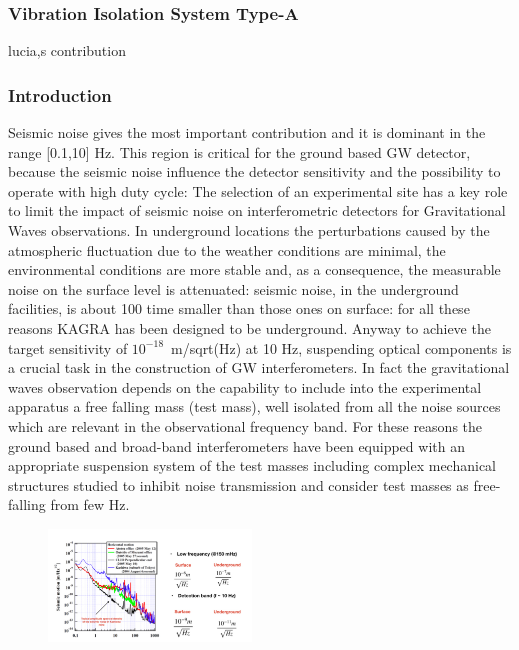 \vspace{10pt}
\subsubsection*{\bf Vibration Isolation System Type-A}
\vspace{3pt}

\vspace{3pt}
lucia,s contribution
%
\subsubsection*{\bi Introduction}
Seismic noise gives the most important contribution and it is dominant in the range [0.1,10] Hz. This region is critical for the ground based GW detector, because the seismic noise influence the detector sensitivity and the possibility to operate with high duty cycle: The selection of an experimental site has a key role to limit the impact of seismic noise on interferometric detectors for Gravitational Waves observations. In underground locations the perturbations caused by the atmospheric fluctuation due to the weather conditions are minimal, the environmental conditions are more stable and, as a consequence, the measurable noise on the surface level is attenuated: seismic noise, in the underground facilities, is about 100 time smaller than those ones on surface:  for all these reasons  KAGRA has been designed to be underground.
Anyway to achieve the target sensitivity of  $10^{-18}$\, m/sqrt(Hz) at 10 Hz, suspending optical components is a crucial task in the construction of GW interferometers. In fact the gravitational waves observation depends on the capability to include into the experimental apparatus a free falling mass (test mass), well isolated from all the noise sources which are relevant in the observational frequency band.
For these reasons the ground based and broad-band interferometers have been equipped with an appropriate suspension system of the test masses including complex mechanical structures studied to inhibit noise transmission and consider test masses as free-falling from few Hz.


\begin{figure}[hbtp]
\begin{center}
\includegraphics[width=0.48\textwidth]{astrodiv/gw/vis-a/Kagraseismicnoise.jpeg}
\caption{\utsm {}}
\label{fig:KAGRAseismicnoise}

\end{center}
\end{figure}

